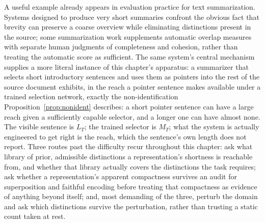 A useful example already appears in evaluation practice for text summarization. Systems designed to produce very short summaries confront the obvious fact that brevity can preserve a coarse overview while eliminating distinctions present in the source; some summarization work supplements automatic overlap measures with separate human judgments of completeness and cohesion, rather than treating the automatic score as sufficient. The same system's central mechanism supplies a more literal instance of this chapter's apparatus: a summarizer that selects short introductory sentences and uses them as pointers into the rest of the source document exhibits, in the reach a pointer sentence makes available under a trained selection network, exactly the non-identification Proposition~\ref{prop:nonident} describes: a short pointer sentence can have a large reach given a sufficiently capable selector, and a longer one can have almost none. The visible sentence is $L_T$; the trained selector is $M_T$; what the system is actually engineered to get right is the reach, which the sentence's own length does not report. Three routes past the difficulty recur throughout this chapter: ask what library of prior, admissible distinctions a representation's shortness is reachable from, and whether that library actually covers the distinctions the task requires; ask whether a representation's apparent compactness survives an audit for superposition and faithful encoding before treating that compactness as evidence of anything beyond itself; and, most demanding of the three, perturb the domain and ask which distinctions survive the perturbation, rather than trusting a static count taken at rest.
